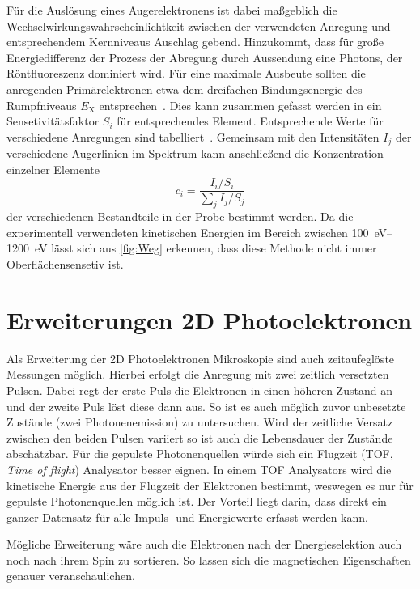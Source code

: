         Für die Auslösung eines Augerelektronens ist dabei maßgeblich die Wechselwirkungswahrscheinlichtkeit zwischen der verwendeten Anregung und entsprechendem Kernniveaus Auschlag gebend.
        Hinzukommt, dass für große Energiedifferenz der Prozess der Abregung durch Aussendung eine Photons, der Röntfluoreszenz dominiert wird.
        Für eine maximale Ausbeute sollten die anregenden Primärelektronen etwa dem dreifachen Bindungsenergie des Rumpfniveaus $E_\text{X}$ entsprechen~\cite{Fauster}.
        Dies kann zusammen gefasst werden in ein Sensetivitätsfaktor $S_i$ für entsprechendes Element.
        Entsprechende Werte für verschiedene Anregungen sind tabelliert~\cite{Auger}.
        Gemeinsam mit den Intensitäten $I_j$ der verschiedene Augerlinien im Spektrum kann anschließend die Konzentration einzelner Elemente
        \begin{equation}
            c_i = \frac{I_i/S_i}{\sum_j I_j/S_j}
            \label{eqn:Auger}
        \end{equation}
        der verschiedenen Bestandteile in der Probe bestimmt werden.
        Da die experimentell verwendeten kinetischen Energien im Bereich zwischen \SIrange[range-phrase=\:und\:]{100}{1200}{\electronvolt} lässt sich aus \autoref{fig:Weg} erkennen, dass diese Methode nicht immer Oberflächensensetiv ist.

    \section{Erweiterungen 2D Photoelektronen}
        Als Erweiterung der 2D Photoelektronen Mikroskopie sind auch zeitaufeglöste Messungen möglich.
        Hierbei erfolgt die Anregung mit zwei zeitlich versetzten Pulsen. 
        Dabei regt der erste Puls die Elektronen in einen höheren Zustand an und der zweite Puls löst diese dann aus.
        So ist es auch möglich zuvor unbesetzte Zustände (zwei Photonenemission) zu untersuchen.
        Wird der zeitliche Versatz zwischen den beiden Pulsen variiert so ist auch die Lebensdauer der Zustände abschätzbar.
        Für die gepulste Photonenquellen würde sich ein Flugzeit (TOF, \textit{Time of flight}) Analysator besser eignen.
        In einem TOF Analysators wird die kinetische Energie aus der Flugzeit der Elektronen bestimmt, weswegen es nur für gepulste Photonenquellen möglich ist.
        Der Vorteil liegt darin, dass direkt ein ganzer Datensatz für alle Impuls- und Energiewerte erfasst werden kann.

        Mögliche Erweiterung wäre auch die Elektronen nach der Energieselektion auch noch nach ihrem Spin zu sortieren.
        So lassen sich die magnetischen Eigenschaften genauer veranschaulichen.